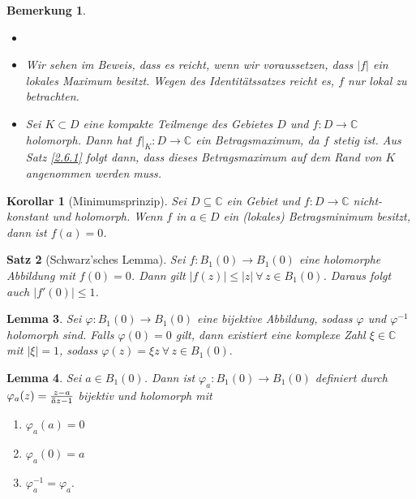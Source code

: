 \documentclass[a4paper,12pt]{book}
\theoremstyle{newthm}
\newtheorem{thm}{Satz}[section]
\newtheorem{lem}[thm]{Lemma}
\newtheorem{cor}[thm]{Korollar}
\theoremstyle{newdef}
\theoremstyle{newrem}
\newtheorem*{rem}{Bemerkung}
\newcommand{\C}{\mathbb{C}}
\newcommand{\bound}[2]{\left.#1\right|_{#2}}
\newcommand{\overbar}[1]{\mkern 1.5mu\overline{\mkern-1.5mu#1\mkern-1.5mu}\mkern 1.5mu}
\begin{document}
		\begin{rem}
			\begin{itemize}
				\item[]
				\item Wir sehen im Beweis, dass es reicht, wenn wir voraussetzen, dass $|f|$ ein lokales Maximum besitzt. Wegen des Identitätssatzes reicht es, $f$ nur lokal zu betrachten.
				\item Sei $ K \subset D $ eine kompakte Teilmenge des Gebietes $D$ und $f : D \to \C$ holomorph. Dann hat $ \bound{f}{K}: D \to \C $ ein Betragsmaximum, da $f$ stetig ist. Aus Satz \ref{2.6.1} folgt dann, dass dieses Betragsmaximum auf dem Rand von $K$ angenommen werden muss.
			\end{itemize}
		\end{rem}
		
		\begin{cor}[Minimumsprinzip]
			Sei $ D \subseteq \C $ ein Gebiet und $ f: D \to \C $ nicht-konstant und holomorph. Wenn $ f $ in $ a \in D $ ein (lokales) Betragsminimum besitzt, dann ist $f(a) = 0$.
		\end{cor}
		
		\begin{thm}[Schwarz'sches Lemma]
			Sei $ f: B_1(0) \to B_1(0) $ eine holomorphe Abbildung mit $f(0)=0$. Dann gilt $ |f(z)| \leq |z|\ \forall\, z \in B_1(0) $. Daraus folgt auch $ |f'(0)| \leq 1 $.
		\end{thm}
		
		\begin{lem}
			Sei $ \varphi: B_1(0) \to B_1(0) $ eine bijektive Abbildung, sodass $ \varphi $ und $ \varphi^{-1} $ holomorph sind. Falls $ \varphi(0)=0 $ gilt, dann existiert eine komplexe Zahl $ \xi \in \C $ mit $ |\xi|=1 $, sodass $ \varphi(z) = \xi z \ \forall\, z \in B_1(0). $
		\end{lem}
		
		\begin{lem}
			Sei $ a \in B_1(0) $. Dann ist $ \varphi_a: B_1(0) \to B_1(0) $ definiert durch $ \varphi_a(z) = \frac{z-a}{\overbar{a}z-1} $ bijektiv und holomorph mit 
			\begin{enumerate}[label={\roman*})]
				\item $\varphi_a(a)=0$
				\item $ \varphi_a(0)=a $
				\item $ \varphi_a^{-1} = \varphi_a. $
			\end{enumerate}
		\end{lem}
		
\end{document}
